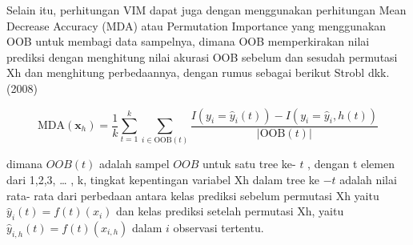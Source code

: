   Selain itu, perhitungan VIM dapat juga dengan menggunakan perhitungan
  Mean Decrease Accuracy (MDA) atau Permutation Importance yang menggunakan
  OOB untuk membagi data sampelnya, dimana OOB memperkirakan nilai prediksi
  dengan menghitung nilai akurasi OOB sebelum dan sesudah permutasi Xh dan
  menghitung perbedaannya, dengan rumus sebagai berikut Strobl dkk. (2008)

  \begin{equation}
    \text{MDA}(\mathbf{x}_h) = \frac{1}{k} \sum_{t=1}^{k} \sum_{i \in \text{OOB}(t)} \frac{I(y_i = \hat{y}_i(t)) - I(y_i = \hat{y}_i, h(t))}{|\text{OOB}(t)|}
    \end{equation}

    dimana $OOB(t)$ adalah sampel $OOB$ untuk satu tree ke- $t$ , dengan t elemen dari 
{1,2,3, … , k}, tingkat kepentingan variabel Xh dalam tree ke $- t$ adalah nilai rata-
rata dari perbedaan antara kelas prediksi sebelum permutasi Xh yaitu $\hat{y}_i(t) = f(t)(x_i)$ dan kelas prediksi setelah permutasi Xh, yaitu $\hat{y}_{i,h}(t) = f(t)(x_{i,h})$
dalam $i$ observasi tertentu.
